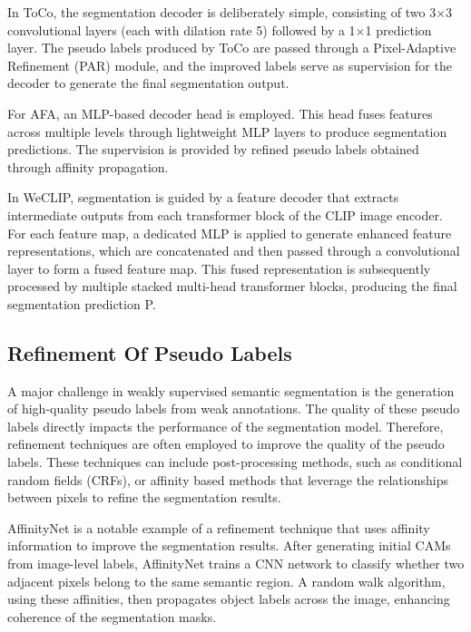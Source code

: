 In ToCo\cite{wsss_toco_token_contrast}, the segmentation decoder is deliberately simple, consisting of two 3×3 convolutional layers (each with dilation rate 5) followed by a 1×1 prediction layer. The pseudo labels produced by ToCo are passed through a Pixel-Adaptive Refinement (PAR) module, and the improved labels serve as supervision for the decoder to generate the final segmentation output.

For AFA\cite{wsss_afa_affinity_from_attention}, an MLP-based decoder head is employed. This head fuses features across multiple levels through lightweight MLP layers to produce segmentation predictions. The supervision is provided by refined pseudo labels obtained through affinity propagation.

In WeCLIP\cite{wsss_frozen_clip}, segmentation is guided by a feature decoder that extracts intermediate outputs from each transformer block of the CLIP image encoder. For each feature map, a dedicated MLP is applied to generate enhanced feature representations, which are concatenated and then passed through a convolutional layer to form a fused feature map. This fused representation is subsequently processed by multiple stacked multi-head transformer blocks, producing the final segmentation prediction P.

\subsection{Refinement Of Pseudo Labels}
\label{subsec:refinement-of-pseudo-labels}
A major challenge in weakly supervised semantic segmentation is the generation of high-quality pseudo labels from weak annotations. The quality of these pseudo labels directly impacts the performance of the segmentation model. Therefore, refinement techniques are often employed to improve the quality of the pseudo labels. These techniques can include post-processing methods, such as conditional random fields (CRFs), or affinity based methods that leverage the relationships between pixels to refine the segmentation results.

AffinityNet \cite{wsss_affinitynet} is a notable example of a refinement technique that uses affinity information to improve the segmentation results. After generating initial CAMs from image-level labels, AffinityNet trains a CNN network to classify whether two adjacent pixels belong to the same semantic region. A random walk algorithm, using these affinities, then propagates object labels across the image, enhancing coherence of the segmentation masks.

